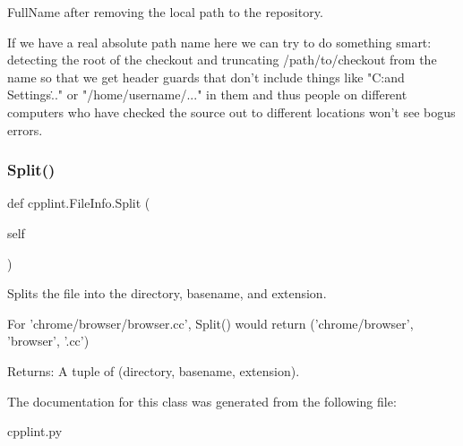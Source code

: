 \begin{DoxyVerb}FullName after removing the local path to the repository.

If we have a real absolute path name here we can try to do something smart:
detecting the root of the checkout and truncating /path/to/checkout from
the name so that we get header guards that don't include things like
"C:\Documents and Settings\..." or "/home/username/..." in them and thus
people on different computers who have checked the source out to different
locations won't see bogus errors.
\end{DoxyVerb}
 \mbox{\label{classcpplint_1_1FileInfo_a43f1c5ff1771da52e29c60c114955e72}} 
\subsubsection{\texorpdfstring{Split()}{Split()}}
{\footnotesize\ttfamily def cpplint.\+File\+Info.\+Split (\begin{DoxyParamCaption}\item[{}]{self }\end{DoxyParamCaption})}

\begin{DoxyVerb}Splits the file into the directory, basename, and extension.

For 'chrome/browser/browser.cc', Split() would
return ('chrome/browser', 'browser', '.cc')

Returns:
  A tuple of (directory, basename, extension).
\end{DoxyVerb}
 

The documentation for this class was generated from the following file\+:\begin{DoxyCompactItemize}
\item 
cpplint.\+py\end{DoxyCompactItemize}
